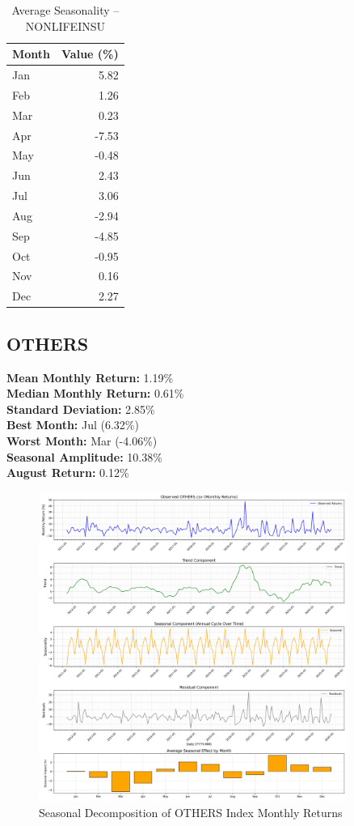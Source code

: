 \documentclass[12pt]{article}
\begin{document}
\begin{table}[h!]
\centering
\caption{Average Seasonality -- NONLIFEINSU}
\begin{tabular}{l r}
\toprule
Month & Value (\%) \\
\midrule
Jan & 5.82 \\
Feb & 1.26 \\
Mar & 0.23 \\
Apr & -7.53 \\
May & -0.48 \\
Jun & 2.43 \\
Jul & 3.06 \\
Aug & -2.94 \\
Sep & -4.85 \\
Oct & -0.95 \\
Nov & 0.16 \\
Dec & 2.27 \\
\bottomrule
\end{tabular}
\end{table}


\clearpage

\subsection{OTHERS}
\textbf{Mean Monthly Return:} 1.19\% \\
\textbf{Median Monthly Return:} 0.61\% \\
\textbf{Standard Deviation:} 2.85\% \\
\textbf{Best Month:} Jul (6.32\%) \\
\textbf{Worst Month:} Mar (-4.06\%) \\
\textbf{Seasonal Amplitude:} 10.38\% \\
\textbf{August Return:} 0.12\% \\

\begin{figure}[h!]
    \centering
    \includegraphics[width=0.9\textwidth]{decomposition_outputs/OTHERS_seasonal_decomposition.png}
    \caption{Seasonal Decomposition of OTHERS Index Monthly Returns}
\end{figure}
\end{document}
